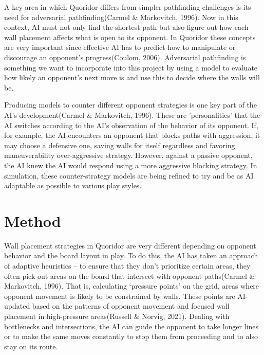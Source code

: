 \documentclass[12pt]{report}
\begin{document}
A key area in which Quoridor differs from simpler pathfinding challenges is its need for adversarial pathfinding(Carmel \& Markovitch, 1996). Now in this context, AI must not only find the shortest path but also figure out how each wall placement affects what is open to its opponent. In Quoridor these concepts are very important since effective AI has to predict how to manipulate or discourage an opponent’s progress(Coulom, 2006). Adversarial pathfinding is something we want to incorporate into this project by using a model to evaluate how likely an opponent's next move is and use this to decide where the walls will be.

Producing models to counter different opponent strategies is one key part of the AI’s development(Carmel \& Markovitch, 1996). These are 'personalities' that the AI switches according to the AI's observation of the behavior of its opponent. If, for example, the AI encounters an opponent that blocks paths with aggression, it may choose a defensive one, saving walls for itself regardless and favoring maneuverability over-aggressive strategy. However, against a passive opponent, the AI knew the AI would respond using a more aggressive blocking strategy. In simulation, these counter-strategy models are being refined to try and be as AI adaptable as possible to various play styles.



\newpage

\chapter{Method}
Wall placement strategies in Quoridor are very different depending on opponent behavior and the board layout in play. To do this, the AI has taken an approach of adaptive heuristics – to ensure that they don’t prioritize certain areas, they often pick out areas on the board that intersect with opponent paths(Carmel \& Markovitch, 1996). That is, calculating ‘pressure points’ on the grid, areas where opponent movement is likely to be constrained by walls. These points are AI-updated based on the patterns of opponent movement and focused wall placement in high-pressure areas(Russell \& Norvig, 2021). Dealing with bottlenecks and intersections, the AI can guide the opponent to take longer lines or to make the same moves constantly to stop them from proceeding and to also stay on its route.
\end{document}
